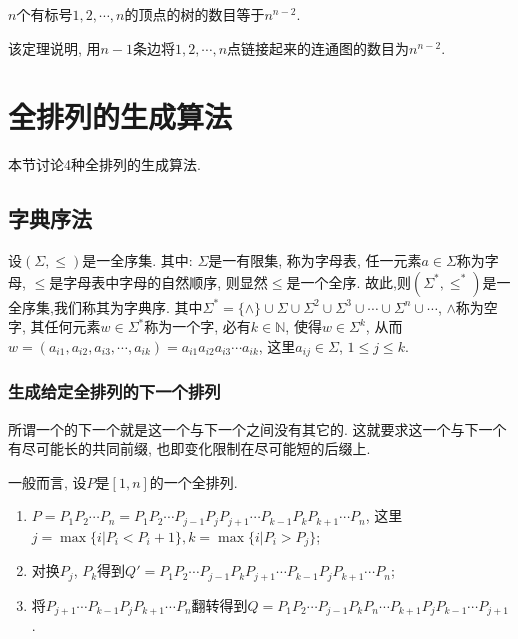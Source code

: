     \begin{theorem}[Cayley定理] \rm
        $n$个有标号$1,2,\cdots,n$的顶点的树的数目等于$n^{n-2}$.
    \end{theorem}
    该定理说明, 用$n-1$条边将$1,2,\cdots,n$点链接起来的连通图的数目为$n^{n-2}$.


\section{全排列的生成算法}

    本节讨论4种全排列的生成算法.

    \subsection{字典序法}

        \begin{definition}[字典序]
            设$(\Sigma,\leqslant)$是一全序集. 其中: $\Sigma$是一有限集, 称为\textsf{字母表}, 任一元素$a\in\Sigma$称为\textsf{字母}, $\leqslant$是字母表中字母的\textsf{自然顺序}, 则显然$\leqslant$是一个\textsf{全序}. 故此,则$(\Sigma^*,\leqslant^*)$是一\textsf{全序集},我们称其为\textsf{字典序}. 其中$\Sigma^*=\{\wedge\}\cup\Sigma\cup\Sigma^2\cup\Sigma^3\cup\cdots\cup\Sigma^n\cup\cdots$, $\wedge$称为空字, 其任何元素$w\in\Sigma^*$称为一个字, 必有$k\in\mathbb{N}$, 使得$w\in\Sigma^k$, 从而$w=(a_{i1},a_{i2},a_{i3},\cdots,a_{ik})=a_{i1}a_{i2}a_{i3}\cdots a_{ik}$, 这里$a_{ij}\in\Sigma$, $1\leqslant j\leqslant k$.
        \end{definition}

        \subsubsection{生成给定全排列的下一个排列}

            所谓一个的下一个就是这一个与下一个之间没有其它的. 这就要求这一个与下一个有尽可能长的共同前缀, 也即变化限制在尽可能短的后缀上. 
            
            \begin{algorithm}[在字典序中求一个排列的下一个排列]
                 一般而言, 设$P$是$[1,n]$的一个全排列. 
                 \begin{enumerate}
                     \item $P=P_1P_2\cdots P_n=P_1P_2\cdots P_{j-1}P_{j}P_{j+1}\cdots P_{k-1}P_kP_{k+1}\cdots P_n$, 这里$j=\max\{i|P_i<P_i+1\}, k=\max\{i|P_i>P_j\}$;
                     \item 对换$P_j$, $P_k$得到$Q'=P_1P_2\cdots P_{j-1}P_kP_{j+1}\cdots P_{k-1}P_jP_{k+1}\cdots P_n$;
                     \item 将$P_{j+1}\cdots P_{k-1}P_jP_{k+1}\cdots P_n$翻转得到$Q=P_1P_2\cdots P_{j-1}P_kP_n\cdots P_{k+1}P_jP_{k-1}\cdots P_{j+1}$.
                 \end{enumerate}
             \end{algorithm}

